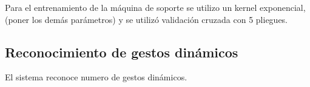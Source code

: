 Para el entrenamiento de la máquina de soporte se utilizo un kernel exponencial, (poner los demás parámetros) y se utilizó validación cruzada con 5 pliegues. 

\subsection{Reconocimiento de gestos dinámicos}\label{RecognitionDynamic}

El sistema reconoce numero de gestos dinámicos.  

%


%
%
%
%  
	
\newpage

